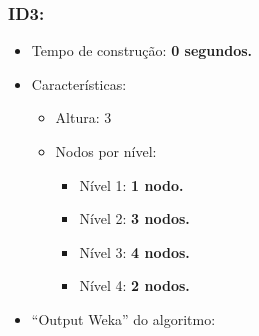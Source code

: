 \documentclass[
    article,            %
    11pt,               %
    oneside,            %
    a4paper,            %
    english,            %
    brazil,             %
    sumario=tradicional,
    ]{abntex2}
\begin{document}
\subsubsection*{\textbf{ID3:}}
    \begin{itemize}
        \item Tempo de construção: \textbf{0 segundos.}
        \item Características:
        \begin{itemize}
            \item Altura: 3
            \item Nodos por nível:
                \begin{itemize}
                    \item Nível 1: \textbf{1 nodo.}
                    \item Nível 2: \textbf{3 nodos.}
                    \item Nível 3: \textbf{4 nodos.}
                    \item Nível 4: \textbf{2 nodos.}
                \end{itemize}
        \end{itemize}
        \item ``Output Weka'' do algoritmo:
    \end{itemize}   
\end{document}
